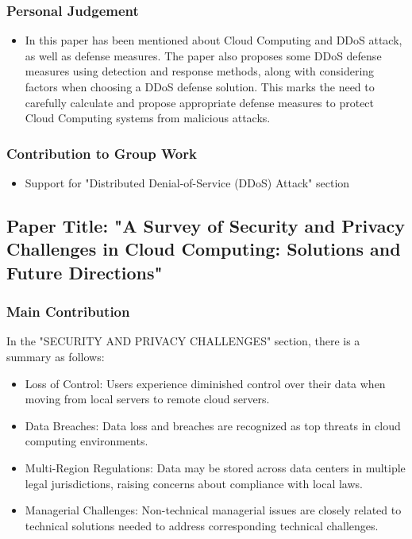 \documentclass[12pt, twoside]{article}
\begin{document}
\subsubsection{Personal Judgement}
\begin{itemize}
    \item  In this paper has been mentioned about Cloud Computing and DDoS attack, as well as defense measures. The paper also proposes some DDoS defense measures using detection and response methods, along with considering factors when choosing a DDoS defense solution. This marks the need to carefully calculate and propose appropriate defense measures to protect Cloud Computing systems from malicious attacks.
\end{itemize}

\subsubsection{Contribution to Group Work}
\begin{itemize}
    \item  Support for "Distributed Denial-of-Service (DDoS) Attack" section
\end{itemize}
\subsection{Paper Title: "A Survey of Security and Privacy Challenges in Cloud Computing: Solutions and Future Directions" \cite{liu2015survey}}

\subsubsection{Main Contribution}
In the "SECURITY AND PRIVACY CHALLENGES" section, there is a summary as follows:
\begin{itemize}
    \item  Loss of Control: Users experience diminished control over their data when moving from local servers to remote cloud servers.
    \item   Data Breaches: Data loss and breaches are recognized as top threats in cloud computing environments.
    \item    Multi-Region Regulations: Data may be stored across data centers in multiple legal jurisdictions, raising concerns about compliance with local laws.
    \item     Managerial Challenges: Non-technical managerial issues are closely related to technical solutions needed to address corresponding technical challenges.
\end{itemize}
    
\end{document}
